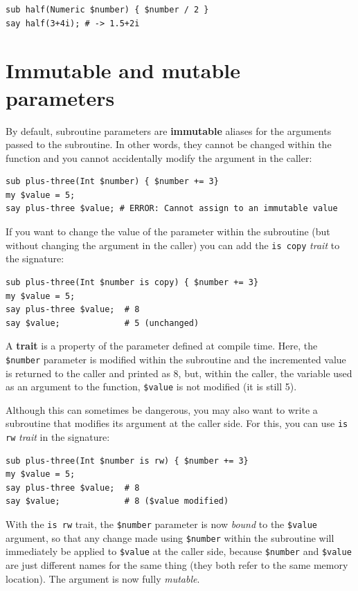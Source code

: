 \begin{verbatim}
sub half(Numeric $number) { $number / 2 }
say half(3+4i); # -> 1.5+2i
\end{verbatim}

\section{Immutable and mutable parameters}

By default, subroutine parameters are {\bf immutable} aliases for 
the arguments passed to the subroutine. In other words, they 
cannot be changed within the function and you cannot 
accidentally modify the argument in the caller:

\begin{verbatim}
sub plus-three(Int $number) { $number += 3}
my $value = 5;
say plus-three $value; # ERROR: Cannot assign to an immutable value
\end{verbatim}

If you want to change the value of the parameter within the 
subroutine (but without changing the argument in the caller) 
you can add the {\tt is copy} \emph{trait} to the signature:

\begin{verbatim}
sub plus-three(Int $number is copy) { $number += 3}
my $value = 5;
say plus-three $value;  # 8
say $value;             # 5 (unchanged)
\end{verbatim}
%
A {\bf trait} is a property of the parameter defined at compile time. 
Here, the {\tt \$number} parameter is modified within the 
subroutine and the incremented value is returned to the caller 
and printed as 8, but, within the caller, the variable used
as an argument to the function, {\tt \$value} is not 
modified (it is still 5).

Although this can sometimes be dangerous, you may also want 
to write a subroutine that modifies its argument at the caller 
side. For this, you can use {\tt is rw} \emph{trait} 
in the signature:

\begin{verbatim}
sub plus-three(Int $number is rw) { $number += 3}
my $value = 5;
say plus-three $value;  # 8
say $value;             # 8 ($value modified)
\end{verbatim}
%
With the {\tt is rw} trait, the {\tt \$number} parameter is 
now  \emph{bound} to the {\tt \$value} argument, so that any change 
made using {\tt \$number} within the subroutine will immediately 
be applied to {\tt \$value} at the caller side, because {\tt \$number} 
and {\tt \$value} are just different names for the same thing (they 
both refer to the same memory location). The argument is now 
fully \emph{mutable}.


